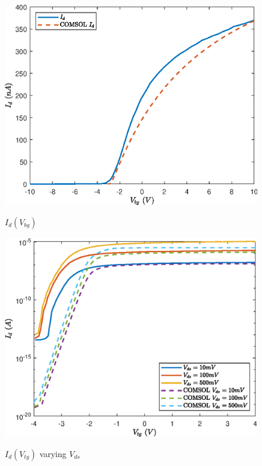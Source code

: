 \documentclass[12pt,a4paper,titlepage]{article}
\begin{document}
\begin{figure}[H]
	\centering
	\includegraphics[width=1\textwidth]{Grafici/Id(Vbg)_HfO2_MoS2.eps} 
	\label{fig:Id(Vbg)_HfO2_MoS2}
	\caption{$I_d(V_{bg})$}
\end{figure}

\begin{figure}[H]
	\centering
	\includegraphics[width=1\textwidth]{Grafici/Id(Vtg)_HfO2_MoS2_varying_Vds.eps} 
	\label{fig:Id(Vtg)_HfO2_MoS2_varying_Vds}
	\caption{$I_d(V_{tg})$ varying $V_{ds}$}
\end{figure}
\end{document}
